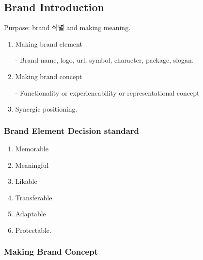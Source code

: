 \documentclass[12pt]{article}
\begin{document}
\subsection{Brand Introduction}

Purpose: brand 식별 and making meaning.

\begin{enumerate}
	\item Making brand element

	- Brand name, logo, url, symbol, character, package, slogan.
	\item Making brand concept

	- Functionality or experiencability or representational concept
	\item Synergic positioning.
\end{enumerate}

\subsubsection{Brand Element Decision standard}

\begin{enumerate}
	\item Memorable
	\item Meaningful
	\item Likable
	\item Transferable
	\item Adaptable
	\item Protectable.
\end{enumerate}

\subsubsection{Making Brand Concept}
\end{document}
